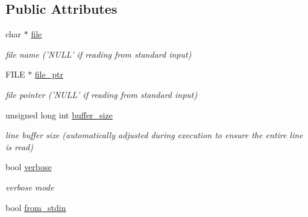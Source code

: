 \subsection*{Public Attributes}
\begin{DoxyCompactItemize}
\item 
\hypertarget{classGenomicRegionSet_a7c593d1beab775590d5b810097644583}{
char $\ast$ \hyperlink{classGenomicRegionSet_a7c593d1beab775590d5b810097644583}{file}}
\label{classGenomicRegionSet_a7c593d1beab775590d5b810097644583}

\begin{DoxyCompactList}\small\item\em file name ('NULL' if reading from standard input) \end{DoxyCompactList}\item 
\hypertarget{classGenomicRegionSet_a4ca6c6268e39fdea2add6e6381c66962}{
FILE $\ast$ \hyperlink{classGenomicRegionSet_a4ca6c6268e39fdea2add6e6381c66962}{file\_\-ptr}}
\label{classGenomicRegionSet_a4ca6c6268e39fdea2add6e6381c66962}

\begin{DoxyCompactList}\small\item\em file pointer ('NULL' if reading from standard input) \end{DoxyCompactList}\item 
\hypertarget{classGenomicRegionSet_a4d60b5403d2d6aaeda541ed45625b245}{
unsigned long int \hyperlink{classGenomicRegionSet_a4d60b5403d2d6aaeda541ed45625b245}{buffer\_\-size}}
\label{classGenomicRegionSet_a4d60b5403d2d6aaeda541ed45625b245}

\begin{DoxyCompactList}\small\item\em line buffer size (automatically adjusted during execution to ensure the entire line is read) \end{DoxyCompactList}\item 
\hypertarget{classGenomicRegionSet_a2646e9e6d5da1693b4bea36a5acc082e}{
bool \hyperlink{classGenomicRegionSet_a2646e9e6d5da1693b4bea36a5acc082e}{verbose}}
\label{classGenomicRegionSet_a2646e9e6d5da1693b4bea36a5acc082e}

\begin{DoxyCompactList}\small\item\em verbose mode \end{DoxyCompactList}\item 
\hypertarget{classGenomicRegionSet_abd0fc2542e717e5855e03d3b3892f027}{
bool \hyperlink{classGenomicRegionSet_abd0fc2542e717e5855e03d3b3892f027}{from\_\-stdin}}
\label{classGenomicRegionSet_abd0fc2542e717e5855e03d3b3892f027}


\end{DoxyCompactItemize}
